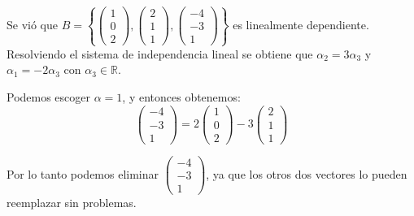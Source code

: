 \documentclass[12pt]{book}
\def\R{\mathbb{R}}
\begin{document}
{\small Se vi\'o que $B=\left\{\left(\begin{array}{c} 1\\ 0\\ 2\end{array}\right),\left(\begin{array}{c} 2\\ 1\\ 1\end{array}\right),\left(\begin{array}{c} -4\\ -3\\ 1\end{array}\right)\right\}$ es linealmente dependiente.
Resolviendo el sistema de independencia lineal se obtiene que $\alpha_2=3\alpha_3$ y $\alpha_1=-2\alpha_3$ con $\alpha_3\in\R$.

Podemos escoger $\alpha=1$, y entonces obtenemos:
$$\left(\begin{array}{c} -4\\ -3\\ 1\end{array}\right)=2\left(\begin{array}{c} 1\\ 0\\ 2\end{array}\right)-3\left(\begin{array}{c} 2\\ 1\\ 1\end{array}\right)$$ 

Por lo tanto podemos eliminar $\left(\begin{array}{c} -4\\ -3\\ 1\end{array}\right)$, ya que los otros dos vectores lo pueden reemplazar sin problemas.
}  
\end{document}
